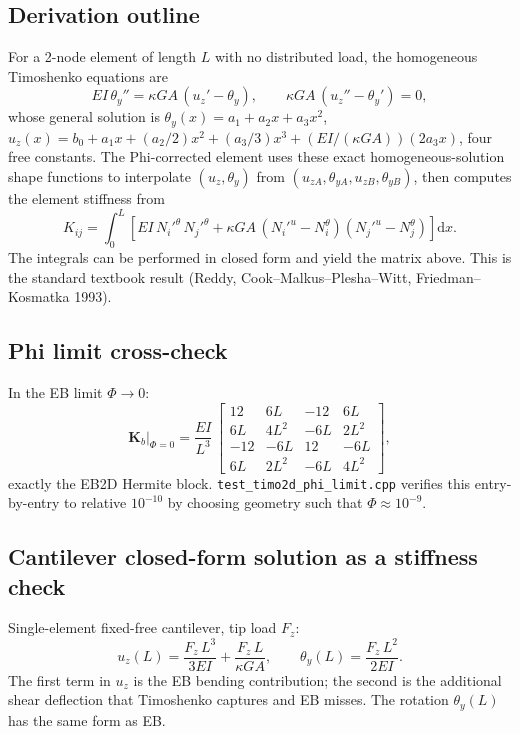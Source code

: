 \documentclass[11pt,a4paper]{article}
\newcommand{\dd}{\mathrm{d}}
\newcommand{\bmath}[1]{\boldsymbol{#1}}
\begin{document}
\subsection{Derivation outline}

For a 2-node element of length $L$ with no distributed load, the homogeneous Timoshenko equations are
\[
EI\,\theta_y'' = \kappa GA\,(u_z' - \theta_y), \qquad \kappa GA\,(u_z'' - \theta_y') = 0,
\]
whose general solution is $\theta_y(x) = a_1 + a_2 x + a_3 x^2$, $u_z(x) = b_0 + a_1 x + (a_2/2)x^2 + (a_3/3)x^3 + (EI/(\kappa GA))(2 a_3 x)$, four free constants. The Phi-corrected element uses these exact homogeneous-solution shape functions to interpolate $(u_z, \theta_y)$ from $(u_{zA}, \theta_{yA}, u_{zB}, \theta_{yB})$, then computes the element stiffness from
\[
K_{ij} = \int_0^L \left[ EI\,N_i'^\theta\,N_j'^\theta + \kappa GA\,(N_i'^u - N_i^\theta)(N_j'^u - N_j^\theta) \right] \dd x.
\]
The integrals can be performed in closed form and yield the matrix above. This is the standard textbook result (Reddy, Cook--Malkus--Plesha--Witt, Friedman--Kosmatka 1993).

\subsection{Phi limit cross-check}\label{sec:philimit}

In the EB limit $\Phi \to 0$:
\[
\bmath{K}_b \big|_{\Phi=0} = \dfrac{E I}{L^3}\,
\begin{bmatrix}
12      & 6L    & -12     & 6L   \\
6L      & 4L^2  & -6L     & 2L^2 \\
-12     & -6L   & 12      & -6L  \\
6L      & 2L^2  & -6L     & 4L^2
\end{bmatrix},
\]
exactly the EB2D Hermite block. \texttt{test\_timo2d\_phi\_limit.cpp} verifies this entry-by-entry to relative $10^{-10}$ by choosing geometry such that $\Phi \approx 10^{-9}$.

\subsection{Cantilever closed-form solution as a stiffness check}

Single-element fixed-free cantilever, tip load $F_z$:
\[
u_z(L) = \dfrac{F_z\,L^3}{3 EI} + \dfrac{F_z\,L}{\kappa GA},
\qquad
\theta_y(L) = \dfrac{F_z\,L^2}{2 EI}.
\]
The first term in $u_z$ is the EB bending contribution; the second is the additional shear deflection that Timoshenko captures and EB misses. The rotation $\theta_y(L)$ has the same form as EB.
\end{document}
